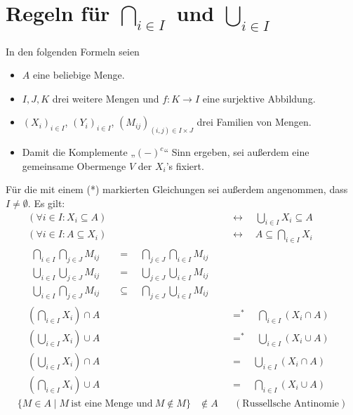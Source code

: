 \endgroup




 
\section{Regeln für $\bigcap_{i\in I}$ und $\bigcup_{i\in I}$}
In den folgenden Formeln seien
\begin{itemize}
    \item $A$ eine beliebige Menge.
    \item $I,J,K$ drei weitere Mengen und $f:K\to I$ eine surjektive Abbildung.
    \item $(X_i)_{i\in I}$, $(Y_i)_{i\in I}$, $(M_{ij})_{(i,j)\in I\times J}$ drei Familien von Mengen.
    \item Damit die Komplemente „$(-)^c$“ Sinn ergeben, sei außerdem eine gemeinsame Obermenge $V$ der $X_i$'s fixiert.
\end{itemize}
Für die mit einem (*) markierten Gleichungen sei außerdem angenommen, dass $I\neq\emptyset$. Es gilt:
\begingroup
\allowdisplaybreaks
\begin{align*}
    (\forall i\in I : X_i \subseteq A) & \quad\leftrightarrow\quad \bigcup_{i\in I} X_i \subseteq A \\
    (\forall i\in I : A\subseteq X_i) & \quad\leftrightarrow\quad A \subseteq \bigcap_{i\in I} X_i \\[1em]
    \begin{split}
    \bigcap_{i\in I} \bigcap_{j\in J} M_{ij} & \quad =\quad \bigcap_{j\in J}\bigcap_{i\in I} M_{ij} \\
    \bigcup_{i\in I} \bigcup_{j\in J} M_{ij} & \quad =\quad \bigcup_{j\in J}\bigcup_{i\in I} M_{ij} \\
    \bigcup_{i\in I}\bigcap_{j\in J} M_{ij} & \quad\subseteq\quad \bigcap_{j\in J}\bigcup_{i\in I} M_{ij}
    \end{split} && \\[1em]
    (\bigcap_{i\in I} X_i) \cap A & \quad =^* \quad \bigcap_{i \in I} (X_i \cap A) \\
    (\bigcup_{i\in I} X_i) \cup A & \quad =^* \quad \bigcup_{i\in I} (X_i \cup A) \\
    (\bigcup_{i\in I} X_i) \cap A & \quad =\quad \bigcup_{i\in I} (X_i \cap A) \\
    (\bigcap_{i\in I} X_i) \cup A & \quad =\quad \bigcap_{i\in I} (X_i \cup A) %
\end{align*}
\begin{align*}
    \{ M\in A\mid M\ \text{ist eine Menge und}\ M\notin M \} & \notin A && (\text{Russellsche Antinomie})
\end{align*}
